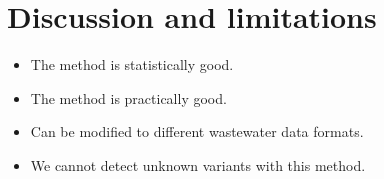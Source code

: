 \documentclass{article}
\newenvironment{tightemize}
{ \begin{itemize}
    \setlength{\itemsep}{0pt}
    \setlength{\parskip}{0pt}
    \setlength{\parsep}{0pt}     }
{ \end{itemize}                  }
\begin{document}
\section{Discussion and limitations}

\begin{tightemize}
    \item The method is statistically good.
    \item The method is practically good.
    \item Can be modified to different wastewater data formats.
    \item We cannot detect unknown variants with this method.
\end{tightemize}


{}

\end{document}
